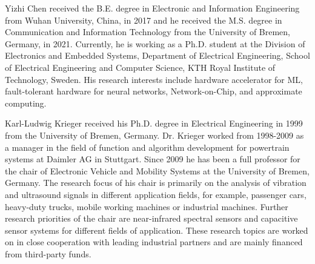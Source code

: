 \begin{IEEEbiography}{Yizhi Chen} received the B.E. degree in Electronic and Information Engineering from Wuhan University, China, in 2017 and he received the M.S. degree in Communication and Information Technology from the University of Bremen, Germany, in 2021. Currently, he is working as a Ph.D. student at the Division of Electronics and Embedded Systems, Department of Electrical Engineering, School of Electrical Engineering and Computer Science, KTH Royal Institute of Technology, Sweden. His research interests include hardware accelerator for ML, fault-tolerant hardware for neural networks, Network-on-Chip, and approximate computing.
\end{IEEEbiography}

\begin{IEEEbiography}{Karl-Ludwig Krieger} received his Ph.D. degree in Electrical Engineering in 1999 from the University of Bremen, Germany. Dr. Krieger worked from 1998-2009 as a manager in the field of function and algorithm development for powertrain systems at Daimler AG in Stuttgart. Since 2009 he has been a full professor for the chair of Electronic Vehicle and Mobility Systems at the University of Bremen, Germany. The research focus of his chair is primarily on the analysis of vibration and ultrasound signals in different application fields, for example, passenger cars, heavy-duty trucks, mobile working machines or industrial machines. Further research priorities of the chair are near-infrared spectral sensors and capacitive sensor systems for different fields of application. These research topics are worked on in close cooperation with leading industrial partners and are mainly financed from third-party funds.
\end{IEEEbiography}

